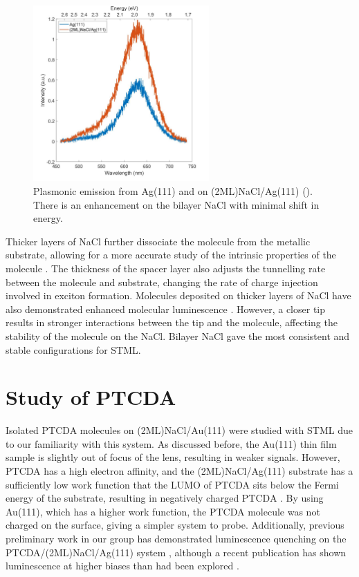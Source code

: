 \begin{figure} [h]
    \centering
    \includegraphics[width=0.6\textwidth]{pictures/NaCl_enhancement_Ag111_275V_250pA_10s.jpg}
    \caption{Plasmonic emission from Ag(111) and on (2ML)NaCl/Ag(111) (). There is an enhancement on the bilayer NaCl with minimal shift in energy. }
    \label{fig:opv:nacl-plasmon}
\end{figure}

Thicker layers of NaCl further dissociate the molecule from the metallic substrate, allowing for a more accurate study of the intrinsic properties of the molecule \citep{repp2005molecules}. The thickness of the spacer layer also adjusts the tunnelling rate between the molecule and substrate, changing the rate of charge injection involved in exciton formation. Molecules deposited on thicker layers of NaCl have also demonstrated enhanced molecular luminescence \citep{Zhang2017,Kroger2018}. However, a closer tip results in stronger interactions between the tip and the molecule, affecting the stability of the molecule on the NaCl. Bilayer NaCl gave the most consistent and stable configurations for \ac{STML}.



\section{Study of PTCDA}

Isolated \ac{PTCDA} molecules on (2ML)NaCl/Au(111) were studied with \ac{STML} due to our familiarity with this system. As discussed before, the Au(111) thin film sample is slightly out of focus of the lens, resulting in weaker signals. However, \ac{PTCDA} has a high electron affinity, and the (2ML)NaCl/Ag(111) substrate has a sufficiently low work function that the \ac{LUMO} of PTCDA sits below the Fermi energy of the substrate, resulting in negatively charged PTCDA \citep{cochrane2017single,cochrane2018molecularly}. By using Au(111), which has a higher work function, the PTCDA molecule was not charged on the surface, giving a simpler system to probe. Additionally, previous preliminary work in our group has demonstrated luminescence quenching on the PTCDA/(2ML)NaCl/Ag(111) system \citep{roussy2016coupling}, although a recent publication has shown luminescence at higher biases than had been explored \citep{Kimura2019}.

